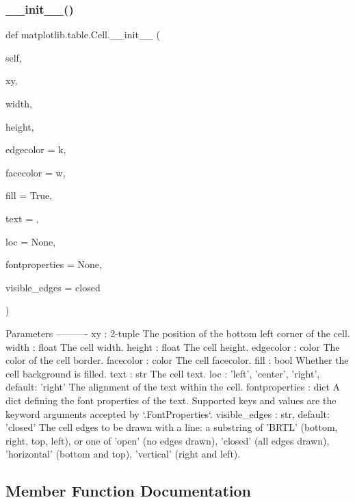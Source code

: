 \subsubsection{\texorpdfstring{\+\_\+\+\_\+init\+\_\+\+\_\+()}{\_\_init\_\_()}}
{\footnotesize\ttfamily def matplotlib.\+table.\+Cell.\+\_\+\+\_\+init\+\_\+\+\_\+ (\begin{DoxyParamCaption}\item[{}]{self,  }\item[{}]{xy,  }\item[{}]{width,  }\item[{}]{height,  }\item[{}]{edgecolor = {\ttfamily \textquotesingle{}k\textquotesingle{}},  }\item[{}]{facecolor = {\ttfamily \textquotesingle{}w\textquotesingle{}},  }\item[{}]{fill = {\ttfamily True},  }\item[{}]{text = {\ttfamily \textquotesingle{}\textquotesingle{}},  }\item[{}]{loc = {\ttfamily None},  }\item[{}]{fontproperties = {\ttfamily None},  }\item[{}]{visible\+\_\+edges = {\ttfamily \textquotesingle{}closed\textquotesingle{}} }\end{DoxyParamCaption})}

\begin{DoxyVerb}Parameters
----------
xy : 2-tuple
    The position of the bottom left corner of the cell.
width : float
    The cell width.
height : float
    The cell height.
edgecolor : color
    The color of the cell border.
facecolor : color
    The cell facecolor.
fill : bool
    Whether the cell background is filled.
text : str
    The cell text.
loc : {'left', 'center', 'right'}, default: 'right'
    The alignment of the text within the cell.
fontproperties : dict
    A dict defining the font properties of the text. Supported keys and
    values are the keyword arguments accepted by `.FontProperties`.
visible_edges : str, default: 'closed'
    The cell edges to be drawn with a line: a substring of 'BRTL'
    (bottom, right, top, left), or one of 'open' (no edges drawn),
    'closed' (all edges drawn), 'horizontal' (bottom and top),
    'vertical' (right and left).
\end{DoxyVerb}
 

\subsection{Member Function Documentation}
\mbox{\label{classmatplotlib_1_1table_1_1Cell_a96d590c2b639ddf0deee31e209df4e13}} 
